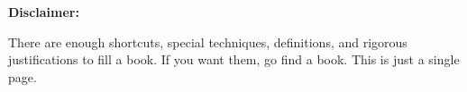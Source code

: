 \textbf{Disclaimer:}
\vspace{-.8\parskip}

There are enough shortcuts, special techniques, definitions, and rigorous justifications to fill a book. If you want them, go find a book.  This is just a single page.


